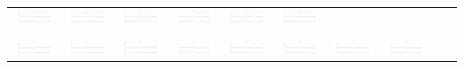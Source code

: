\documentclass[]{article}
\begin{document}
\begin{table}[h]
\begin{tabular}{| c | c | c | c | c | c | c | c | c | c |}
		\includegraphics[width=0.09\linewidth]{0.50_0.40.png} &
		\includegraphics[width=0.09\linewidth]{0.50_0.50.png} &
		\includegraphics[width=0.09\linewidth]{0.50_0.60.png} &
		\includegraphics[width=0.09\linewidth]{0.50_0.70.png} &
		\includegraphics[width=0.09\linewidth]{0.50_0.80.png} &
		\includegraphics[width=0.09\linewidth]{0.50_0.90.png} \\
		& & & & & & & & & \\
		\hline
		& & & & & & & & & \\
		\includegraphics[width=0.09\linewidth]{0.60_0.00.png} &
		\includegraphics[width=0.09\linewidth]{0.60_0.10.png} &
		\includegraphics[width=0.09\linewidth]{0.60_0.20.png} &
		\includegraphics[width=0.09\linewidth]{0.60_0.30.png} &
		\includegraphics[width=0.09\linewidth]{0.60_0.40.png} &
		\includegraphics[width=0.09\linewidth]{0.60_0.50.png} &
		\includegraphics[width=0.09\linewidth]{0.60_0.60.png} &
		\includegraphics[width=0.09\linewidth]{0.60_0.70.png} &

\end{tabular}
\end{table}
\end{document}
